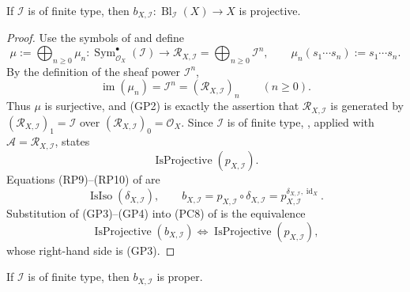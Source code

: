 \begin{theorem}
  \label{thm:nagata-global-blowup-projective}
  \lean{}

  If \(\mathcal I\) is of finite type, then
  \(b_{X,\mathcal I}\colon\operatorname{Bl}_{\mathcal I}(X)\to X\) is
  projective.
\end{theorem}

\begin{proof}
  Use the symbols of
   and define
  \[
    \mu:=\bigoplus_{n\geq0}\mu_n\colon
      \operatorname{Sym}_{\mathcal O_X}^{\bullet}(\mathcal I)
        \longrightarrow
      \mathscr R_{X,\mathcal I}=\bigoplus_{n\geq0}\mathcal I^n,
    \qquad
    \mu_n(s_1\cdots s_n):=s_1\cdots s_n.                       \tag{GP1}
  \]
  By the definition of the sheaf power $\mathcal I^n$,
  \[
    \operatorname{im}(\mu_n)=\mathcal I^n
      =(\mathscr R_{X,\mathcal I})_n\qquad(n\geq0).             \tag{GP2}
  \]
  Thus $\mu$ is surjective, and (GP2) is exactly the assertion that
  $\mathscr R_{X,\mathcal I}$ is generated by
  $(\mathscr R_{X,\mathcal I})_1=\mathcal I$ over
  $(\mathscr R_{X,\mathcal I})_0=\mathcal O_X$.  Since $\mathcal I$ is of
  finite type,
  \cite[\href{https://stacks.math.columbia.edu/tag/07ZS}{Tag 07ZS}]
  {stacks-project}, applied with
  $\mathcal A=\mathscr R_{X,\mathcal I}$, states
  \[
    \operatorname{IsProjective}(p_{X,\mathcal I}).              \tag{GP3}
  \]
  Equations (RP9)--(RP10) of
   are
  \[
    \operatorname{IsIso}(\delta_{X,\mathcal I}),
    \qquad
    b_{X,\mathcal I}=p_{X,\mathcal I}\circ\delta_{X,\mathcal I}
      =p_{X,\mathcal I}^{\delta_{X,\mathcal I},\operatorname{id}_X}.
                                                                    \tag{GP4}
  \]
  Substitution of (GP3)--(GP4) into (PC8) of
   is the equivalence
  \[
    \operatorname{IsProjective}(b_{X,\mathcal I})
      \Longleftrightarrow
    \operatorname{IsProjective}(p_{X,\mathcal I}),
  \]
  whose right-hand side is (GP3).
\end{proof}

\begin{theorem}
  \label{thm:nagata-global-blowup-proper}
  \leanok

  If \(\mathcal I\) is of finite type, then
  \(b_{X,\mathcal I}\) is proper.
\end{theorem}

